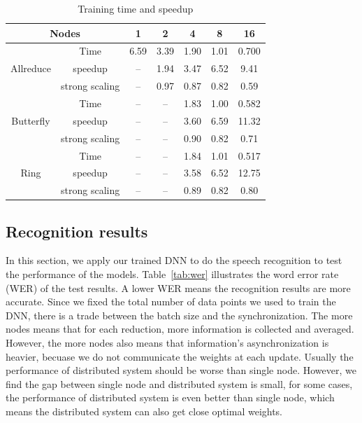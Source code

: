 \documentclass{article}
\begin{document}
\begin{table}
  \centering
  \begin{tabular}{c|c|c|c|c|c|c}
    \hline
           \multicolumn{2}{c|}{Nodes}   & 1    & 2    & 4    & 8    & 16 \\
    \hline
\multirow{3}{*}{Allreduce} &    Time    & 6.59 & 3.39 & 1.90 & 1.01 & 0.700\\
                           &    speedup & --   & 1.94 & 3.47 & 6.52 & 9.41\\
                           &strong scaling& -- & 0.97 & 0.87 &0.82 & 0.59 \\
    \hline
\multirow{3}{*}{Butterfly} &    Time    & --   & --   & 1.83 & 1.00 & 0.582\\
                           &    speedup & --   & --   & 3.60 & 6.59 & 11.32\\
                           &strong scaling&--  & --   & 0.90 & 0.82 & 0.71\\
    \hline
\multirow{3}{*}{Ring}      &    Time    & --   & --   & 1.84 & 1.01 & 0.517\\
                           &    speedup & --   & --   & 3.58 & 6.52 & 12.75\\
                           &strong scaling&--  & --   & 0.89 & 0.82 & 0.80\\
    \hline
  \end{tabular}
  \caption{Training time and speedup}
  \label{tab:speedup}
\end{table}

\subsection{Recognition results}

In this section, we apply our trained DNN to do the speech recognition to test the performance of the models. 
Table~\ref{tab:wer} illustrates the word error rate (WER) of the test results. A lower WER means the recognition results are more accurate. Since we fixed the total number of data points we used to train the DNN, there is a trade between the batch size and the synchronization. The more nodes means that for each reduction, more information is collected and averaged. However, the more nodes also means that information's asynchronization is heavier, becuase we do not communicate the weights at each update. Usually the performance of distributed system should be worse than single node. However, we find the gap between single node and distributed system is small, for some cases, the performance of distributed system is even better than single node, which means the distributed system can also get close optimal weights. \\
\end{document}
